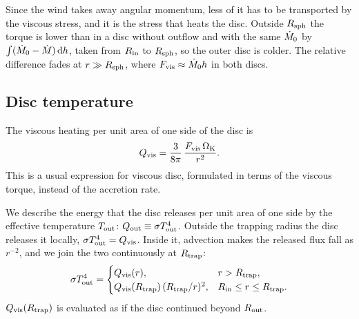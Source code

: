 Since the wind takes away angular momentum, less of it has to be transported by the viscous stress, and it is the stress that heats the disc.
Outside $R_{\rm sph}$ the torque is lower than in a disc without outflow and with the same $\dot M_0$ by $\int (\dot M_0 - \dot M)\,{\rm d}h$, taken from $R_{\rm in}$ to $R_{\rm sph}$, so the outer disc is colder.
The relative difference fades at $r \gg R_{\rm sph}$, where $F_{\rm vis} \approx \dot M_0 h$ in both discs.

\subsection{Disc temperature}
\label{sec:disc:teff}

The viscous heating per unit area of one side of the disc is
\begin{equation}
Q_{\rm vis} = \frac{3}{8\pi}\,\frac{F_{\rm vis}\,\Omega_{\rm K}}{r^2} .
\label{eq:Qvis}
\end{equation}
This is a usual expression for viscous disc, formulated in terms of the viscous torque, instead of the accretion rate.  

We describe the energy that the disc releases per unit area of one side by the effective temperature $T_{\rm out}$: $Q_{\rm out} \equiv \sigma T_{\rm out}^4$.
Outside the trapping radius the disc releases it locally, $\sigma T_{\rm out}^4 = Q_{\rm vis}$.
Inside it, advection makes the released flux fall as $r^{-2}$, and we join the two continuously at $R_{\rm trap}$:
\begin{equation}
\sigma T_{\rm out}^4 =
\begin{cases}
Q_{\rm vis}(r), & r > R_{\rm trap}, \\
Q_{\rm vis}(R_{\rm trap})\,(R_{\rm trap}/r)^2, & R_{\rm in} \le r \le R_{\rm trap} .
\end{cases}
\label{eq:Teff}
\end{equation}
$Q_{\rm vis}(R_{\rm trap})$ is evaluated as if the disc continued beyond $R_{\rm out}$.

